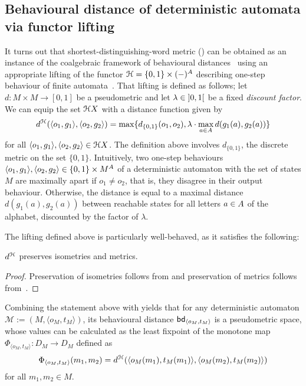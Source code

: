 \subsection{Behavioural distance of deterministic automata via functor lifting}	
It turns out that shortest-distinguishing-word metric () can be obtained as an instance of the coalgebraic framework of behavioural distances~\cite[Example~6.5]{Baldan:2018:Coalgebraic} using an appropriate lifting of the functor $\mathcal{H} = \{0,1\} \times (-)^{A}$ describing one-step behaviour of finite automata~\cite[Example~6.3]{Baldan:2018:Coalgebraic}. That lifting is defined as follows; let $d \colon M \times M \to [0,1]$ be a pseudometric and let $\lambda \in \interval[open]{0}{1}$ be a fixed \emph{discount factor}. We can equip the set $\mathcal{H} X$ with a distance function given by
\[
	d^{\mathcal{H}}(\langle o_1, g_1 \rangle, \langle o_2, g_2 \rangle) = \max\{d_{\{0,1\}}(o_1, o_2), \lambda \cdot \max_{a \in {A}} d(g_1(a), g_2(a))\} 
\]   
for all $\langle o_1, g_1 \rangle, \langle o_2, g_2 \rangle \in \mathcal{H} X$. The definition above involves $d_{\{0,1\}}$, the discrete metric on the set $\{0,1\}$. Intuitively, two one-step behaviours $\langle o_1, g_1\rangle, \langle o_2, g_2 \rangle \in \{0,1\} \times M^{A}$ of a deterministic automaton with the set of states $M$ are maximally apart if $o_1 \neq o_2$, that is, they disagree in their output behaviour. Otherwise, the distance is equal to a maximal distance $d(g_1(a), g_2(a))$ between reachable states for all letters $a \in {A}$ of the alphabet, discounted by the factor of $\lambda$.

The lifting defined above is particularly well-behaved, as it satisfies the following:

\begin{proposition}
	$d^{\mathcal{H}}$ preserves isometries and metrics.
\end{proposition}
\begin{proof}
	Preservation of isometries follows from \cite[Theorem 5.23]{Baldan:2018:Coalgebraic} and preservation of metrics follows from~\cite[Theorem~5.24]{Baldan:2018:Coalgebraic}.
\end{proof}
Combining the statement above with  yields that for any deterministic automaton $\mathcal{M} := (M, \langle o_M, t_M \rangle)$, its behavioural distance $\mathsf{bd}_{\langle o_M, t_M \rangle}$ is a pseudometric space, whose values can be calculated as the least fixpoint of the monotone map $\Phi_{\langle o_M, t_M\rangle} \colon D_M \to D_M$ defined as
$$
\Phi_{\langle o_M, t_M\rangle}(m_1, m_2) = d^{\mathcal{H}}(\langle o_M(m_1), t_{M}(m_1) \rangle, \langle o_M(m_2), t_{M}(m_2) \rangle)
$$
for all $m_1, m_2 \in M$.

